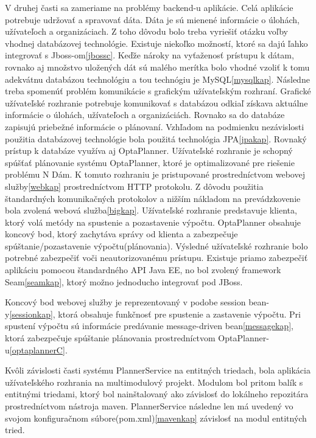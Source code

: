 V druhej časti sa zameriame na problémy backend-u aplikácie. Celá aplikácie potrebuje udržovať a spravovať dáta. Dáta je sú mienené informácie o úlohách, užívateľoch a organizáciach. Z toho dôvodu bolo treba vyriešiť otázku voľby vhodnej databázovej technológie. Existuje niekoľko možností, ktoré sa dajú ľahko integrovať s Jboss-om\ref{jbossc}. Keďže nároky na vyťaženosť prístupu k dátam, rovnako aj množstvo uložených dát sú malého merítka bolo vhodné vzoliť k tomu adekvátnu databázou technológiu a tou technógiu je MySQL\ref{mysqlkap}. Následne treba spomenúť problém komunikácie s grafickým užívateľským rozhraní. Grafické užívateľské rozhranie potrebuje komunikovať s databázou odkiaľ získava aktuálne informácie o úlohách, užívateľoch a organizáciách. Rovnako sa do databáze zapisujú priebežné informácie o plánovaní. Vzhľadom na podmienku nezávislosti použitia databázovej technológie bola použitá technológia JPA\ref{jpakap}. Rovnaký prístup k databáze využíva aj OptaPlanner. Užívateľské rozhranie je schopný spúšťať plánovanie systému OptaPlanner, ktoré je optimalizované pre riešenie problému N Dám. K tomuto rozhraniu je pristupované prostredníctvom webovej služby\ref{webkap} prostredníctvom HTTP protokolu. Z dôvodu použitia štandardných komunikačných protokolov a nižším nákladom na prevádzkovenie bola zvolená  webová služba\ref{bigkap}. Užívateľské rozhranie predstavuje klienta, ktorý volá metódy na spustenie a pozastavenie výpočtu. OptaPlanner obsahuje koncový bod, ktorý zachytáva správy od klienta a zabezpečuje spúštanie/pozastavenie výpočtu(plánovania). Výsledné užívateľské rozhranie bolo potrebné zabezpečiť voči neautorizovanému prístupu. Existuje priamo zabezpečiť aplikáciu pomocou štandardného API Java EE, no bol zvolený framework Seam\ref{seamkap}, ktorý možno jednoducho integrovať pod JBoss.

Koncový bod webovej služby je reprezentovaný v podobe session bean-y\ref{sessionkap}, ktorá obsahuje funkčnosť pre spustenie a zastavenie výpočtu. Pri spustení výpočtu sú informácie predávanie message-driven bean\ref{messagekap}, ktorá zabezpečuje spúštanie plánovania prostredníctvom OptaPlanner-u\ref{optaplannerC}.

Kvôli závislosti časti systému PlannerService na entitných triedach, bola aplikácia užívateľského rozhrania na multimodulový projekt. Modulom bol pritom balík s entitnými triedami, ktorý bol nainštalovaný ako závislosť do lokálneho repozitára prostredníctvom nástroja maven. PlannerService následne len má uvedený vo svojom konfiguračnom súbore(pom.xml)\ref{mavenkap} závislosť na modul entitných tried.


